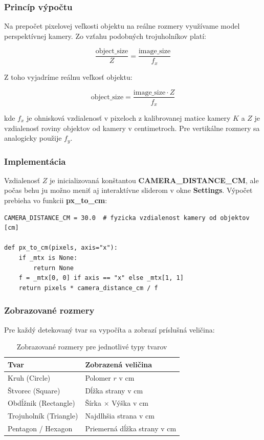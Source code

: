 \documentclass[a4paper, 12pt]{article}
\begin{document}
\subsubsection*{Princíp výpočtu}
Na prepočet pixelovej veľkosti objektu na reálne rozmery využívame model perspektívnej kamery.
Zo vzťahu podobných trojuholníkov platí:

\[
\frac{\text{object\_size}}{Z} = \frac{\text{image\_size}}{f_x}
\]

Z toho vyjadríme reálnu veľkosť objektu:

\[
\text{object\_size} = \frac{\text{image\_size} \cdot Z}{f_{x}}
\]

kde $f_x$ je ohnisková vzdialenosť v pixeloch z kalibrovanej matice kamery $K$ a $Z$     je vzdialenosť roviny objektov od kamery v centimetroch. Pre vertikálne rozmery sa analogicky použije $f_y$.

\subsubsection*{Implementácia}
Vzdialenosť $Z$ je inicializovaná konštantou \textbf{CAMERA\_DISTANCE\_CM}, ale počas behu ju možno meniť aj interaktívne sliderom v okne \textbf{Settings}. Výpočet prebieha vo funkcii \textbf{px\_to\_cm}:

\begin{lstlisting}[caption={Prepočet pixelov na centimetre pomocou kalibračnej matice}]
CAMERA_DISTANCE_CM = 30.0  # fyzicka vzdialenost kamery od objektov [cm]

def px_to_cm(pixels, axis="x"):
    if _mtx is None:
        return None
    f = _mtx[0, 0] if axis == "x" else _mtx[1, 1]
    return pixels * camera_distance_cm / f
\end{lstlisting}

\subsubsection*{Zobrazované rozmery}
Pre každý detekovaný tvar sa vypočíta a zobrazí príslušná veličina:

\begin{table}[h]
\centering
\begin{tabular}{|l|l|}
\hline
\textbf{Tvar} & \textbf{Zobrazená veličina} \\ \hline
Kruh (Circle)         & Polomer $r$ v cm \\ \hline
Štvorec (Square)      & Dĺžka strany v cm \\ \hline
Obdĺžnik (Rectangle)  & Šírka $\times$ Výška v cm \\ \hline
Trojuholník (Triangle) & Najdlhšia strana v cm \\ \hline
Pentagon / Hexagon    & Priemerná dĺžka strany v cm \\ \hline
\end{tabular}
\caption{Zobrazované rozmery pre jednotlivé typy tvarov}
\end{table}
\end{document}

